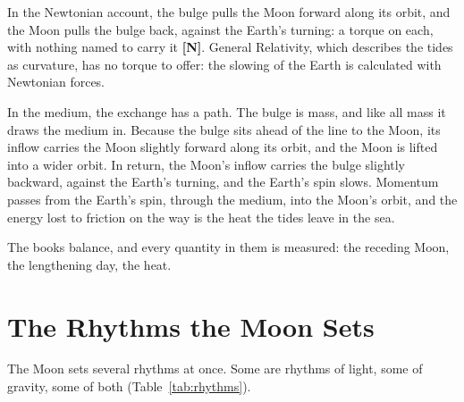 \documentclass[11pt,a4paper]{article}
\newcommand{\reg}[1]{\textsf{\small\textbf{[#1]}}}
\newcommand{\RN}{\reg{N}}
\begin{document}
In the Newtonian account, the bulge pulls the Moon forward along its orbit, and the Moon pulls the bulge back, against the Earth's turning: a torque on each, with nothing named to carry it \RN{}. General Relativity, which describes the tides as curvature, has no torque to offer: the slowing of the Earth is calculated with Newtonian forces.

\begin{hypbar}
In the medium, the exchange has a path. The bulge is mass, and like all mass it draws the medium in. Because the bulge sits ahead of the line to the Moon, its inflow carries the Moon slightly forward along its orbit, and the Moon is lifted into a wider orbit. In return, the Moon's inflow carries the bulge slightly backward, against the Earth's turning, and the Earth's spin slows. Momentum passes from the Earth's spin, through the medium, into the Moon's orbit, and the energy lost to friction on the way is the heat the tides leave in the sea.
\end{hypbar}

The books balance, and every quantity in them is measured: the receding Moon, the lengthening day, the heat. 

\section{The Rhythms the Moon Sets}
\label{sec:rhythms}

The Moon sets several rhythms at once. Some are rhythms of light, some of gravity, some of both (Table~\ref{tab:rhythms}).
\end{document}
